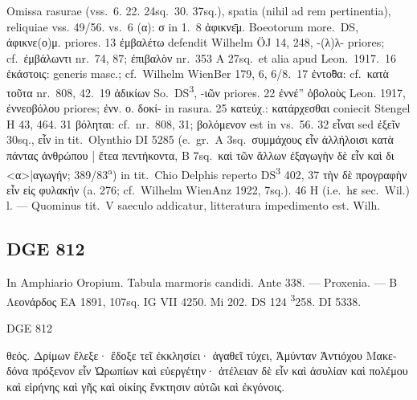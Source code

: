 Omissa rasurae (vss.\ 6. 22. 24sq.\ 30. 37sq.), spatia (nihil ad rem
pertinentia), reliquiae vss. 49/56. vs.\ 6 (\textgreek{α}): \textgreek{σ}
in 1.\ 8 \textgreek{ἀφικνε̄μ}. Boeotorum more.\ DS, \textgreek{ἀφικνε(ο)μ}.
priores. 13 \textgreek{ἐμβαλέτω} defendit Wilhelm ÖJ 14, 248,
-(\textgreek{λ})\textgreek{λ}- priores; cf.\ \textgreek{ἐμβάλωντι} nr.\ 74,
87; \textgreek{ἐπιβαλὸν} nr.\ 353 A 27sq.\ et alia apud Leon.\ 1917.\ 16
\textgreek{ἑκάστοις}: generis masc.; cf.\ Wilhelm WienBer 179, 6, 6/8.\ 17
\textgreek{ἐντο̃θα}: cf.\ \textgreek{κατὰ} \textgreek{τοῦτα}
nr.\ 808, 42.\ 19 \textgreek{ἀδικίων} So.\ DS\textsuperscript{3}, -\textgreek{ιῶν} priores.
22 \textgreek{ἐννέ''} \textgreek{ὀβολοὺς} Leon. 1917,
\textgreek{ἐννεοβόλου} priores; \textgreek{ἐνν}. \textgreek{ο}.
\textgreek{δοκί}- in rasura. 25
\textgreek{κατεύχ}.: \textgreek{κατάρχεσθαι} coniecit Stengel H 43, 464. 31
\textgreek{βόληται}: cf.\ nr.\ 808, 31; \textgreek{βολόμενον} est in vs.\ 
56. 32 \textgreek{εἶναι} sed \textgreek{ἐξεῖν} 30sq., \textgreek{εἶν} in
tit.\ Olynthio DI 5285 (e.\ gr.\ A 3sq.\ \textgreek{συμμάχους εἶν ἀλλήλοισι
κατὰ πάντας ἀνθρώπου\ladd{ς}{\K} | ἔτεα πεντήκοντα}, B 7sq.\ 
\textgreek{καὶ τῶν ἄλλων ἐξαγωγὴν δὲ εἶν καὶ δι}
<\textgreek{α}>|\textgreek{αγωγήν}; 389/83\textsuperscript{a}) in
tit.\ Chio Delphis reperto DS\textsuperscript{3} 402, 37 \textgreek{τὴν δὲ
προγ{\rbrk}ραφὴν εἶν εἰς φυλακήν} (a. 276; cf.\ Wilhelm WienAnz 1922,
7sq.). 46 H (i.e.\ h\textgreek{ε} sec.\ Wil.) l. — Quominus tit.\ V saeculo
addicatur, litteratura impedimento est. Wilh.


\subsection{DGE 812}
In Amphiario Oropium. Tabula marmoris candidi. Ante 338. — Proxenia. —
\textgreek{Β Λεονάρδος} EA 1891, 107sq. IG VII 4250. Mi 202. DS 124
\textsuperscript{3}258.
DI 5338.

\begin{versi}{DGE 812}
  \begin{greek}
    θεός. {\verso[1]} Δρίμων ἔλεξε· ἔδοξε {\verso} τεῖ ἐκκλησίει· ἀγαθεῖ
    τύχει, {\verso} Ἀμύνταν Ἀντιόχου Μακε{\verso}δόνα πρόξενον εἶν
    Ὠρωπί{\verso}ων καὶ εὐεργέτην· ἀτέλειαν {\verso} δὲ εἶν καὶ ἀσυλίαν καὶ
    πολέμου {\verso} καὶ εἰρήνης καὶ γῆς καὶ οἰκίης {\verso} ἔνκτησιν αὐτῶι
    καὶ ἐκγόνοις.
  \end{greek}
\end{versi}

